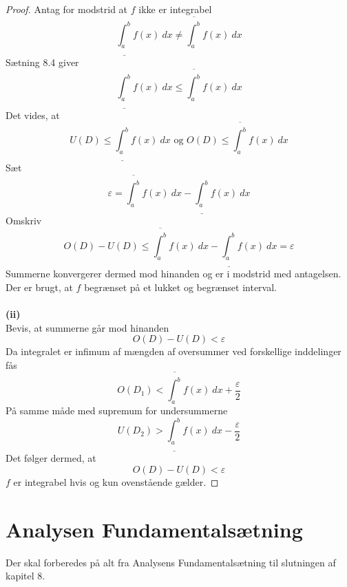 \begin{proof}
Antag for modstrid at $f$ ikke er integrabel
\begin{equation}
\underline{\int_a^b}\! f(x) \ dx\neq\overline{\int_a^b}\! f(x) \ dx
\end{equation}
Sætning 8.4 giver
\begin{equation}
\underline{\int_a^b}\! f(x) \ dx\leq\overline{\int_a^b}\! f(x) \ dx
\end{equation}
Det vides, at 
\begin{equation}
U(D)\leq\underline{\int_a^b}\! f(x) \ dx\text{ og }O(D)\leq\overline{\int_a^b}\! f(x) \ dx
\end{equation}
Sæt
\begin{equation}
\varepsilon = \overline{\int_a^b}\! f(x) \ dx-\underline{\int_a^b}\! f(x) \ dx
\end{equation}
Omskriv
\begin{equation}
O(D)-U(D)\leq\overline{\int_a^b}\! f(x) \ dx-\underline{\int_a^b}\! f(x) \ dx=\varepsilon
\end{equation}
Summerne konvergerer dermed mod hinanden og er i modstrid med antagelsen. Der er brugt, at $f$ begrænset på et lukket og begrænset interval.\\\\
\textbf{(ii)}\\
Bevis, at summerne går mod hinanden
\begin{equation}
O(D)-U(D)<\varepsilon
\end{equation}
Da integralet er infimum af mængden af oversummer ved forskellige inddelinger fås
\begin{equation}
O(D_1)<\overline{\int_a^b}\! f(x) \ dx + \frac{\varepsilon}{2}
\end{equation}
På samme måde med supremum for undersummerne
\begin{equation}
U(D_2)>\underline{\int_a^b}\! f(x) \ dx - \frac{\varepsilon}{2}
\end{equation}
Det følger dermed, at 
\begin{equation}
O(D)-U(D)<\varepsilon
\end{equation}
$f$ er integrabel hvis og kun ovenstående gælder.
\end{proof}
\clearpage
\chapter{Analysen Fundamentalsætning}
Der skal forberedes på alt fra Analysens Fundamentalsætning til slutningen af kapitel 8.
